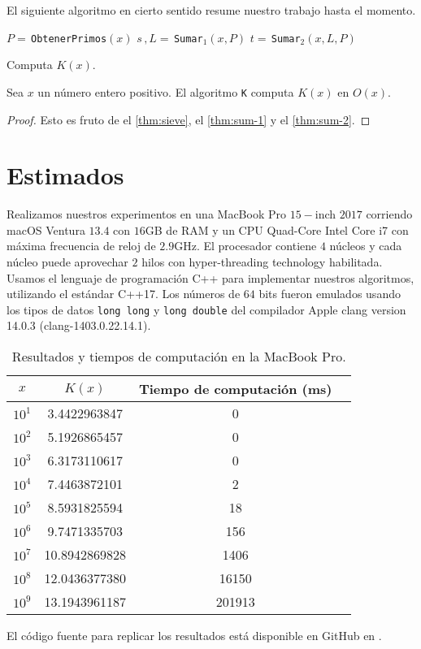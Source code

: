 El siguiente algoritmo en cierto sentido resume nuestro trabajo hasta el momento.

\begin{algorithm}[H]
    \SetAlgoLined
    \DontPrintSemicolon
     {
        \(P = \,\)\texttt{ObtenerPrimos}\((x)\)\;
        \(s \, , L = \,\)\texttt{Sumar}\(_1(x, P)\)\;
        \(t = \,\)\texttt{Sumar}\(_2(x, L, P)\)\;
    }
    \caption{Computa \(K(x)\).}
\end{algorithm}

\begin{theorem}
    Sea \(x\) un n\'umero entero positivo.
    El algoritmo \texttt{K} computa \(K(x)\) en \(O(x)\).
\end{theorem}

\begin{proof}
    Esto es fruto de el \cref{thm:sieve}, el \cref{thm:sum-1} y el \cref{thm:sum-2}.
\end{proof}

\section{Estimados}

Realizamos nuestros experimentos en una
MacBook Pro \(15-\)inch \(2017\)
corriendo macOS Ventura \(13.4\)
con \(16\)GB de RAM y
un CPU Quad-Core Intel Core i7
con m\'axima frecuencia de reloj de \(2.9\)GHz.
El procesador contiene \(4\) n\'ucleos
y cada n\'ucleo puede aprovechar \(2\) hilos
con hyper-threading technology habilitada.
Usamos el lenguaje de programaci\'on C++ para implementar nuestros algoritmos,
utilizando el est\'andar C++17.
Los n\'umeros de \(64\) bits fueron emulados usando los tipos de datos
\texttt{long long} y \texttt{long double} del compilador
Apple clang version 14.0.3 (clang-1403.0.22.14.1).

\begin{table}[htbp]
    \centering
    \caption{Resultados y tiempos de computaci\'on en la MacBook Pro.}
    \begin{tabular}{cccc}
      \toprule
      \textbf{\(x\)} & \textbf{\(K(x)\)} & \textbf{Tiempo de computaci\'on (ms)} \\
      \midrule
      \(10^1\) & 3.4422963847 & 0 \\
      \(10^2\) & 5.1926865457 & 0 \\
      \(10^3\) & 6.3173110617 & 0 \\
      \(10^4\) & 7.4463872101 & 2 \\
      \(10^5\) & 8.5931825594 & 18 \\
      \(10^6\) & 9.7471335703 & 156 \\
      \(10^7\) & 10.8942869828 & 1406 \\
      \(10^8\) & 12.0436377380 & 16150 \\
      \(10^9\) & 13.1943961187 & 201913 \\
      \bottomrule
    \end{tabular}
\end{table}

El c\'odigo fuente para replicar los resultados est\'a disponible en GitHub en
.